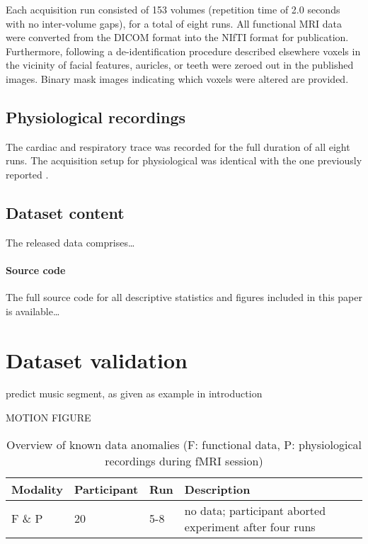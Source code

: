 Each acquisition run consisted of 153 volumes (repetition time of 2.0 seconds
with no inter-volume gaps), for a total of eight runs. All functional MRI data
were converted from the DICOM format into the NIfTI format for publication.
Furthermore, following a de-identification procedure described elsewhere
\cite{HBI+14} voxels in the vicinity of facial features, auricles, or teeth
were zeroed out in the published images. Binary mask images indicating which
voxels were altered are provided.

\subsection*{Physiological recordings}

The cardiac and respiratory trace was recorded for the full duration of all
eight runs. The acquisition setup for physiological was identical with the one
previously reported \cite{HBI+14}.

\subsection*{Dataset content}

The released data comprises\ldots

\paragraph{Source code}

The full source code for all descriptive statistics and figures included in
this paper is available\ldots

\section*{Dataset validation}


predict music segment, as given as example in introduction

MOTION FIGURE


\begin{table}
  \centering
  \caption{Overview of known data anomalies (F: functional data,
    P: physiological recordings during fMRI session)}
  {\renewcommand{\arraystretch}{1.2}
  \begin{tabular}{lllp{9cm}}
    \toprule
    Modality & Participant & Run & Description \\
    \midrule
    F \& P & 20 & 5-8 & no data; participant aborted experiment after four runs \\
    \bottomrule
  \end{tabular}
}
  \label{tab:anomalies}
\end{table}



